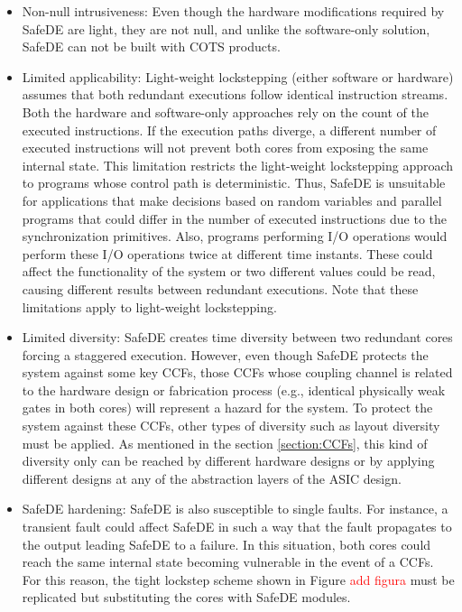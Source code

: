 \begin{itemize}
    \item Non-null intrusiveness: Even though the hardware modifications required by SafeDE are light, they are not null, and unlike the software-only solution, SafeDE can not be built with COTS products.

    \item Limited applicability: Light-weight lockstepping (either software or hardware)  assumes that both redundant executions follow identical instruction streams. Both the hardware and software-only approaches rely on the count of the executed instructions. If the execution paths diverge, a different number of executed instructions will not prevent both cores from exposing the same internal state. This limitation restricts the light-weight lockstepping approach to programs whose control path is deterministic. Thus, SafeDE is unsuitable for applications that make decisions based on random variables and parallel programs that could differ in the number of executed instructions due to the synchronization primitives. Also, programs performing I/O operations would perform these I/O operations twice at different time instants. These could affect the functionality of the system or two different values could be read, causing different results between redundant executions. Note that these limitations apply to light-weight lockstepping.

    \item Limited diversity: SafeDE creates time diversity between two redundant cores forcing a staggered execution. However, even though SafeDE protects the system against some key CCFs, those CCFs whose coupling channel is related to the hardware design or fabrication process (e.g., identical physically weak gates in both cores) will represent a hazard for the system. To protect the system against these CCFs, other types of diversity such as layout diversity must be applied. As mentioned in the section \ref{section:CCFs}, this kind of diversity only can be reached by different hardware designs or by applying different designs at any of the abstraction layers of the ASIC design.

    \item SafeDE hardening: SafeDE is also susceptible to single faults. For instance, a transient fault could affect SafeDE in such a way that the fault propagates to the output leading SafeDE to a failure. In this situation, both cores could reach the same internal state becoming vulnerable in the event of a CCFs. For this reason, the tight lockstep scheme shown in Figure \textcolor{red}{add figura} must be replicated but substituting the cores with SafeDE modules. 
\end{itemize}


